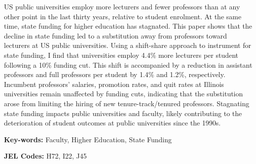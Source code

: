 US public universities employ more lecturers and fewer professors than at any other point in the last thirty years, relative to student enrolment.
At the same time, state funding for higher education has stagnated.
This paper shows that the decline in state funding led to a substitution away from professors toward lecturers at US public universities.
Using a shift-share approach to instrument for state funding, I find that universities employ 4.4\% more lecturers per student following a 10\% funding cut.
This shift is accompanied by a reduction in assistant professors and full professors per student by 1.4\% and 1.2\%, respectively.
Incumbent professors' salaries, promotion rates, and quit rates at Illinois universities remain unaffected by funding cuts, indicating that the substitution arose from limiting the hiring of new tenure-track/tenured professors.
Stagnating state funding impacts public universities and faculty, likely contributing to the deterioration of student outcomes at public universities since the 1990s.

\vfill
\noindent
\textbf{Key-words:}
Faculty,
Higher Education,
State Funding

\vspace{0.05cm}
\noindent
\textbf{JEL Codes:} H72, I22, J45
